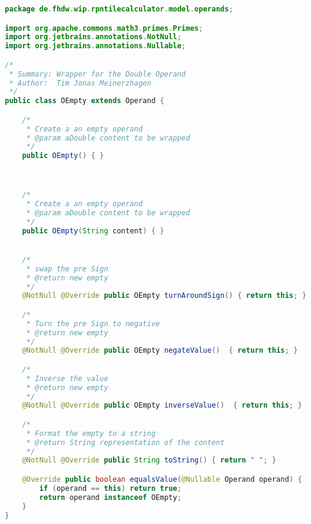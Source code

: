\begin{lstlisting}[caption=OEmpty (Meinerzhagen),label=list:OEmpty,language=Java]
package de.fhdw.wip.rpntilecalculator.model.operands;

import org.apache.commons.math3.primes.Primes;
import org.jetbrains.annotations.NotNull;
import org.jetbrains.annotations.Nullable;

/*
 * Summary: Wrapper for the Double Operand
 * Author:  Tim Jonas Meinerzhagen
 */
public class OEmpty extends Operand {

    /*
     * Create a an empty operand
     * @param aDouble content to be wrapped
     */
    public OEmpty() { }



    /*
     * Create a an empty operand
     * @param aDouble content to be wrapped
     */
    public OEmpty(String content) { }


    /*
     * swap the pre Sign
     * @return new empty
     */
    @NotNull @Override public OEmpty turnAroundSign() { return this; }

    /*
     * Turn the pre Sign to negative
     * @return new empty
     */
    @NotNull @Override public OEmpty negateValue()  { return this; }

    /*
     * Inverse the value
     * @return new empty
     */
    @NotNull @Override public OEmpty inverseValue()  { return this; }

    /*
     * Format the empty to a string
     * @return String representation of the content
     */
    @NotNull @Override public String toString() { return " "; }

    @Override public boolean equalsValue(@Nullable Operand operand) {
        if (operand == this) return true;
        return operand instanceof OEmpty;
    }
}
\end{lstlisting}    

